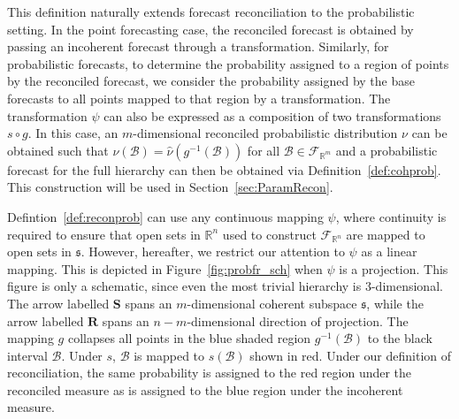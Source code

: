 \documentclass[12pt]{article}
\theoremstyle{definition}
\begin{document}
This definition naturally extends forecast reconciliation to the probabilistic setting. In the point forecasting case, the reconciled forecast is obtained by passing an incoherent forecast through a transformation. Similarly, for probabilistic forecasts, to determine the probability assigned to a region of points by the reconciled forecast, we consider the probability assigned by the base forecasts to all points mapped to that region by a transformation.  The transformation $\psi$ can also be expressed as a composition of two transformations $s\circ g$.  In this case, an $m$-dimensional reconciled probabilistic distribution $\nu$ can be obtained such that $\nu(\mathcal{B})= \hat{\nu}(g^{-1}(\mathcal{B}))$ for all $\mathcal{B} \in \mathscr{F}_{\mathbb{R}^m}$ and a probabilistic forecast for the full hierarchy can then be obtained via Definition~\ref{def:cohprob}.  This construction will be used in Section~\ref{sec:ParamRecon}.

Defintion~\ref{def:reconprob} can use any continuous mapping $\psi$, where continuity is required to ensure that open sets in $\mathbb{R}^n$ used to construct $\mathscr{F}_{\mathbb{R}^n}$ are mapped to open sets in $\mathfrak{s}$.  However, hereafter, we restrict our attention to $\psi$ as a linear mapping.  This is depicted in Figure~\ref{fig:probfr_sch} when $\psi$ is a projection.  This figure is only a schematic, since even the most trivial hierarchy is $3$-dimensional.  The arrow labelled $\bm{S}$ spans an $m$-dimensional coherent subspace $\mathfrak{s}$, while the arrow labelled $\bm{R}$ spans an $n-m$-dimensional direction of projection.  The mapping $g$ collapses all points in the blue shaded region $g^{-1}(\mathcal{B})$ to the black interval $\mathcal{B}$. Under $s$, $\mathcal{B}$ is mapped to $s(\mathcal{B})$ shown in red.  Under our definition of reconciliation, the same probability is assigned to the red region under the reconciled measure as is assigned to the blue region under the incoherent measure.
\end{document}
